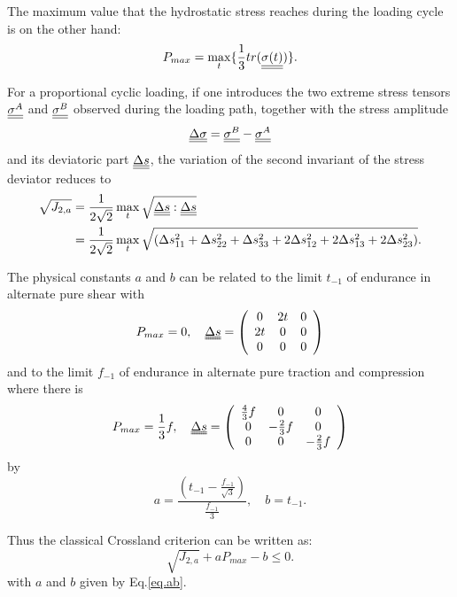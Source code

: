 The maximum value that the hydrostatic stress reaches during the loading cycle is on the other hand:
\begin{equation}
P_{max}=\max\limits_{t}\{\frac{1}{3}tr(\uline{\uline{\sigma(t)}})\}.
\end{equation}

For a proportional cyclic loading, if one introduces the two extreme stress tensors $\uline{\uline{\sigma^A}}$ and $\uline{\uline{\sigma^B}}$ observed during the loading path, together with the stress amplitude
\begin{equation}\uline{\uline{\Delta\sigma}}=\uline{\uline{\sigma^B}}-\uline{\uline{\sigma^A}}\end{equation}
and its deviatoric part $\uline{\uline{\Delta s}} $, the variation of
the second invariant of the stress deviator reduces to 
\begin{equation}
		\begin{split}
			\sqrt{J_{2,a}}&=\frac{1}{2\sqrt{2}}\max\limits_{t}\sqrt{\uline{\uline{\Delta s}}:\uline{\uline{\Delta s}}}\\&=\frac{1}{2\sqrt{2}}\max\limits_{t}\sqrt{(\Delta s_{11}^2+\Delta s_{22}^2+\Delta s_{33}^2+2\Delta s_{12}^2+2\Delta s_{13}^2+2\Delta s_{23}^2)}.
			\end{split}
	\end{equation}

The physical constants $a$ and $b$ can be related to  the limit $t_{-1}$ of endurance in alternate pure shear with $$P_{max}=0, \quad \uuline{\Delta s}=	\left(
\begin{array}{ccc}
0 & 2t & 0\\
2t & 0 & 0\\ 
0 & 0 & 0\\
\end{array}\right)  $$  
and to the limit $f_{-1}$ of endurance in alternate pure traction and compression where there is
$$P_{max}=\frac{1}{3}f, \quad \uuline{\Delta s}=	\left(
\begin{array}{ccc}
\frac{4}{3}f & 0 & 0\\
0 & -\frac{2}{3}f & 0\\ 
0 & 0 & -\frac{2}{3}f\\
\end{array}\right)  $$  
by
\begin{equation}
a=\frac{(t_{-1}-\frac{f_{-1}}{\sqrt{3}})}{\frac{f_{-1}}{3}}, \quad 
b=t_{-1}.
\label{eq.ab}
\end{equation}

Thus the classical Crossland criterion can be written as:
\begin{equation}
\sqrt{J_{2,a}}+a{P_{max}}-b\leqslant 0 .
\end{equation}
with $a$ and $b$ given by Eq.\eqref{eq.ab}.

